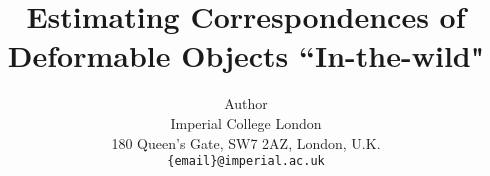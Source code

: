 \title{Estimating Correspondences of Deformable Objects ``In-the-wild"}

\author{Author\\
Imperial College London\\
180 Queen’s Gate, SW7 2AZ, London, U.K.\\
{\tt\small \{email\}@imperial.ac.uk}}

